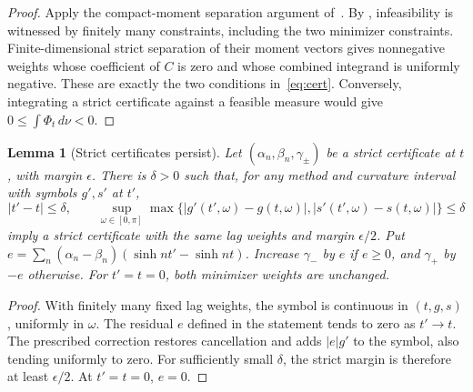 \documentclass[11pt]{article}
\newtheorem{lemma}[theorem]{Lemma}
\theoremstyle{definition}
\theoremstyle{remark}
\newcommand{\sh}{\sinh}
\begin{document}
\begin{proof}
Apply the compact-moment separation argument of~\cite[Theorem~2.5(a)]{TA}.
By , infeasibility is witnessed by finitely many constraints, including the two minimizer
constraints.  Finite-dimensional strict separation of their moment vectors gives nonnegative weights
whose coefficient of \(C\) is zero and whose combined integrand is uniformly negative.
These are exactly the two conditions in~\eqref{eq:cert}.
Conversely, integrating a strict certificate against a feasible measure would give
\(0\le\int\Phi_t\,d\nu<0\).
\end{proof}

\begin{lemma}[Strict certificates persist]\label{lem:persist}
Let \((\alpha_n,\beta_n,\gamma_\pm)\) be a strict certificate at \(t\), with
margin \(\epsilon\).  There is \(\delta>0\) such that, for any method and
curvature interval with symbols \(g',s'\) at \(t'\),
\[
|t'-t|\le\delta,\qquad
\sup_{\omega\in[0,\pi]}\max\{|g'(t',\omega)-g(t,\omega)|,
|s'(t',\omega)-s(t,\omega)|\}\le\delta
\]
imply a strict certificate with the same lag weights and margin \(\epsilon/2\).
Put \(e=\sum_n(\alpha_n-\beta_n)(\sh nt'-\sh nt)\).
Increase \(\gamma_-\) by \(e\) if \(e\ge0\), and \(\gamma_+\) by \(-e\) otherwise.
For \(t'=t=0\), both minimizer weights are unchanged.
\end{lemma}

\begin{proof}
With finitely many fixed lag weights, the symbol is continuous in
\((t,g,s)\), uniformly in \(\omega\).  The residual \(e\) defined in the statement
tends to zero as \(t'\to t\).  The prescribed correction restores cancellation
and adds \(|e|g'\) to the symbol, also tending uniformly to zero.
For sufficiently small \(\delta\), the strict margin is therefore at least
\(\epsilon/2\).  At \(t'=t=0\), \(e=0\).
\end{proof}
\end{document}
